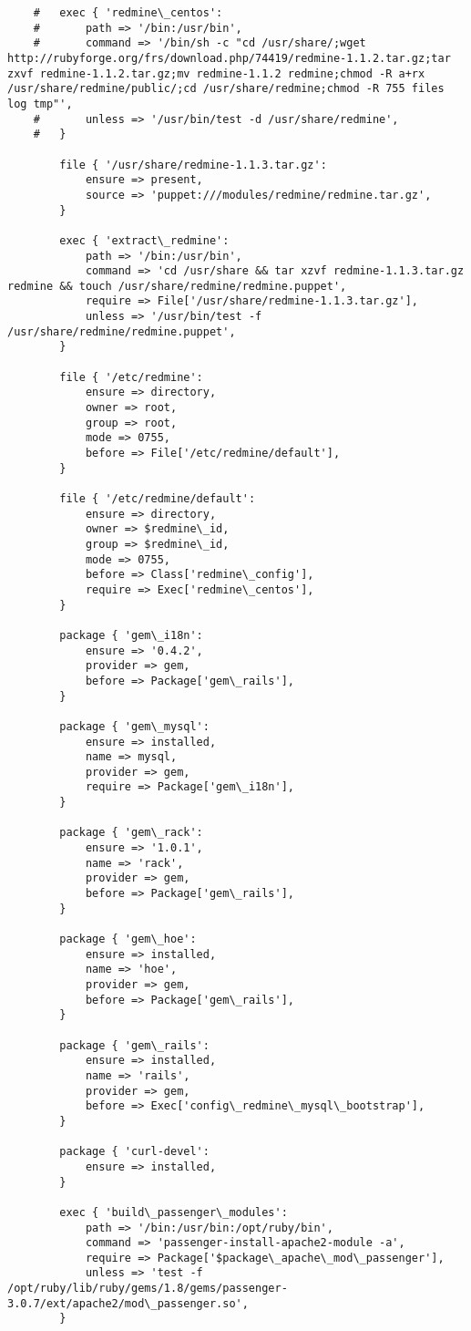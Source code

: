 \begin{verbatim}
	#	exec { 'redmine\_centos':
	#		path => '/bin:/usr/bin',
	#		command => '/bin/sh -c "cd /usr/share/;wget http://rubyforge.org/frs/download.php/74419/redmine-1.1.2.tar.gz;tar zxvf redmine-1.1.2.tar.gz;mv redmine-1.1.2 redmine;chmod -R a+rx /usr/share/redmine/public/;cd /usr/share/redmine;chmod -R 755 files log tmp"',
	#		unless => '/usr/bin/test -d /usr/share/redmine',
	#	}

		file { '/usr/share/redmine-1.1.3.tar.gz':
			ensure => present,
			source => 'puppet:///modules/redmine/redmine.tar.gz',
		}

		exec { 'extract\_redmine':
			path => '/bin:/usr/bin',
			command => 'cd /usr/share && tar xzvf redmine-1.1.3.tar.gz redmine && touch /usr/share/redmine/redmine.puppet',
			require => File['/usr/share/redmine-1.1.3.tar.gz'],
			unless => '/usr/bin/test -f /usr/share/redmine/redmine.puppet',
		}

		file { '/etc/redmine':
			ensure => directory,
			owner => root,
			group => root,
			mode => 0755,
			before => File['/etc/redmine/default'],
		}

		file { '/etc/redmine/default':
			ensure => directory,
			owner => $redmine\_id,
			group => $redmine\_id,
			mode => 0755,
			before => Class['redmine\_config'],
			require => Exec['redmine\_centos'],
		}

		package { 'gem\_i18n':
			ensure => '0.4.2',
			provider => gem,
			before => Package['gem\_rails'],
		}

		package { 'gem\_mysql':
			ensure => installed,
			name => mysql,
			provider => gem,
			require => Package['gem\_i18n'],
		}

		package { 'gem\_rack':
			ensure => '1.0.1',
			name => 'rack',
			provider => gem,
			before => Package['gem\_rails'],
		}

		package { 'gem\_hoe':
			ensure => installed,
			name => 'hoe',
			provider => gem,
			before => Package['gem\_rails'],
		}

		package { 'gem\_rails':
			ensure => installed,
			name => 'rails',
			provider => gem,
			before => Exec['config\_redmine\_mysql\_bootstrap'],
		}

		package { 'curl-devel':
			ensure => installed,
		}

		exec { 'build\_passenger\_modules':
			path => '/bin:/usr/bin:/opt/ruby/bin',
			command => 'passenger-install-apache2-module -a',
			require => Package['$package\_apache\_mod\_passenger'],
			unless => 'test -f /opt/ruby/lib/ruby/gems/1.8/gems/passenger-3.0.7/ext/apache2/mod\_passenger.so',
		}


\end{verbatim}
